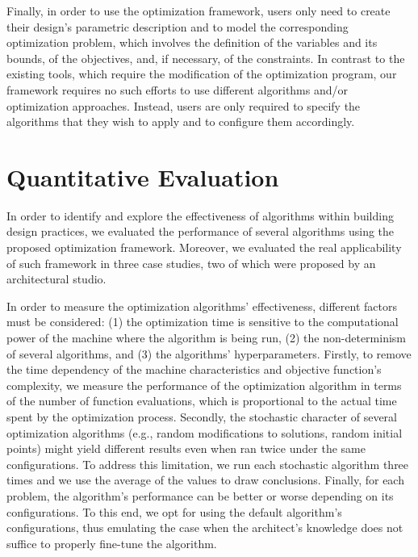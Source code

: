 Finally, in order to use the optimization framework, users only need to create their design's parametric description and to model the corresponding optimization problem, which involves the definition of the variables and its bounds, of the objectives, and, if necessary, of the constraints. In contrast to the existing tools, which require the modification of the optimization program, our framework requires no such efforts to use different algorithms and/or optimization approaches. Instead, users are only required to specify the algorithms that they wish to apply and to configure them accordingly.
\section{Quantitative Evaluation}
\label{sec:quantitative}
In order to identify and explore the effectiveness of algorithms within building design practices, we evaluated the performance of several algorithms using the proposed optimization framework. Moreover, we evaluated the real applicability of such framework in three case studies, two of which were proposed by an architectural studio.%

In order to measure the optimization algorithms' effectiveness, different factors must be considered: (1) the optimization time is sensitive to the computational power of the machine where the algorithm is being run, (2) the non-determinism of several algorithms, and (3) the algorithms' hyperparameters. Firstly, to remove the time dependency of the machine characteristics and objective function's complexity, we measure the performance of the optimization algorithm in terms of the number of function evaluations, which is proportional to the actual time spent by the optimization process. Secondly, the stochastic character of several optimization algorithms (e.g., random modifications to solutions, random initial points) might yield different results even when ran twice under the same configurations. To address this limitation, we run each stochastic algorithm three times and we use the average of the values to draw conclusions. Finally, for each problem, the algorithm's performance can be better or worse depending on its configurations. To this end, we opt for using the default algorithm's configurations, thus emulating the case when the architect's knowledge does not suffice to properly fine-tune the algorithm. 

